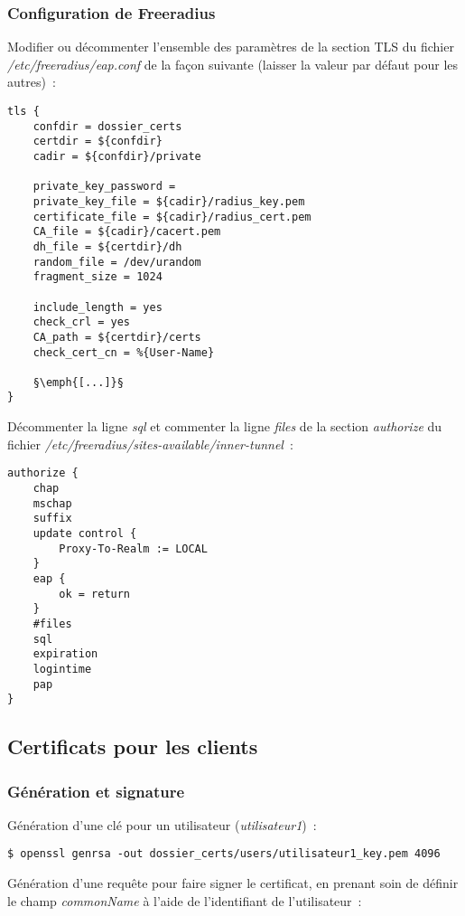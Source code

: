 \subsubsection{Configuration de Freeradius}

Modifier ou décommenter l'ensemble des paramètres de la section TLS du fichier \emph{/etc/freeradius/eap.conf} de la façon suivante (laisser la valeur par défaut pour les autres)~:

\begin{lstlisting}
tls {
	confdir = dossier_certs 
	certdir = ${confdir}
	cadir = ${confdir}/private

	private_key_password =
	private_key_file = ${cadir}/radius_key.pem
	certificate_file = ${cadir}/radius_cert.pem
	CA_file = ${cadir}/cacert.pem
	dh_file = ${certdir}/dh
	random_file = /dev/urandom
	fragment_size = 1024

	include_length = yes
	check_crl = yes
	CA_path = ${certdir}/certs
	check_cert_cn = %{User-Name}

	§\emph{[...]}§
}
\end{lstlisting}

Décommenter la ligne \emph{sql} et commenter la ligne \emph{files} de la section \emph{authorize} du fichier \emph{/etc/freeradius/sites-available/inner-tunnel}~:

\begin{lstlisting}
authorize {
    chap
    mschap
    suffix
    update control {
        Proxy-To-Realm := LOCAL
    }
    eap {
        ok = return
    }
    #files
    sql
    expiration
    logintime
    pap
}
\end{lstlisting}

\subsection{Certificats pour les clients}
\subsubsection{Génération et signature}

Génération d'une clé pour un utilisateur (\emph{utilisateur1})~:

\begin{lstlisting}
$ openssl genrsa -out dossier_certs/users/utilisateur1_key.pem 4096
\end{lstlisting}

Génération d'une requête pour faire signer le certificat, en prenant soin de définir le champ \emph{commonName} à l'aide de l'identifiant de l'utilisateur~:


